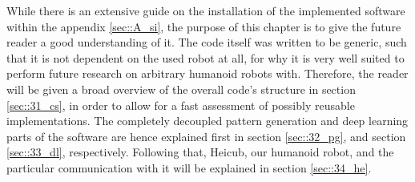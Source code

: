 \label{sec::3_me}
While there is an extensive guide on the installation of the implemented software within the appendix \ref{sec::A_si}, the purpose of this chapter is to give the future reader a good understanding of it. The code itself was written to be generic, such that it is not dependent on the used robot at all, for why it is very well suited to perform future research on arbitrary humanoid robots with. Therefore, the reader will be given a broad overview of the overall code's structure in section \ref{sec::31_cs}, in order to allow for a fast assessment of possibly reusable implementations. The completely decoupled pattern generation and deep learning parts of the software are hence explained first in section \ref{sec::32_pg}, and section \ref{sec::33_dl}, respectively. Following that, Heicub, our humanoid robot, and the particular communication with it will be explained in section \ref{sec::34_he}.







